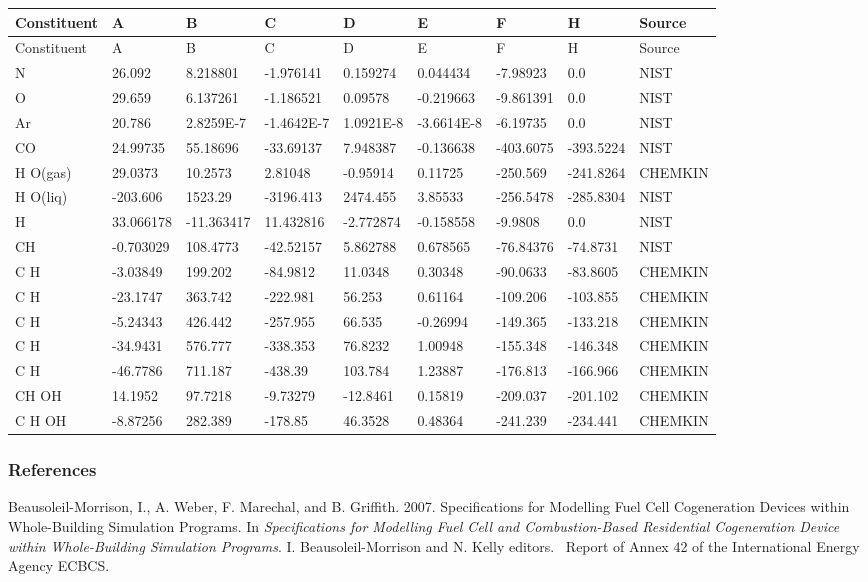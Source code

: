 \begin{longtable}[c]{p{0.66in}p{0.66in}p{0.66in}p{0.66in}p{0.66in}p{0.66in}p{0.66in}p{0.66in}p{0.66in}}
\toprule 
Constituent & A & B & C & D & E & F & H & Source \tabularnewline
\midrule
\endfirsthead

\toprule 
Constituent & A & B & C & D & E & F & H & Source \tabularnewline
\midrule
\endhead

N & 26.092 & 8.218801 & -1.976141 & 0.159274 & 0.044434 & -7.98923 & 0.0 & NIST \tabularnewline
O & 29.659 & 6.137261 & -1.186521 & 0.09578 & -0.219663 & -9.861391 & 0.0 & NIST \tabularnewline
Ar & 20.786 & 2.8259E-7 & -1.4642E-7 & 1.0921E-8 & -3.6614E-8 & -6.19735 & 0.0 & NIST \tabularnewline
CO & 24.99735 & 55.18696 & -33.69137 & 7.948387 & -0.136638 & -403.6075 & -393.5224 & NIST \tabularnewline
H  O(gas) & 29.0373 & 10.2573 & 2.81048 & -0.95914 & 0.11725 & -250.569 & -241.8264 & CHEMKIN \tabularnewline
H  O(liq) & -203.606 & 1523.29 & -3196.413 & 2474.455 & 3.85533 & -256.5478 & -285.8304 & NIST \tabularnewline
H & 33.066178 & -11.363417 & 11.432816 & -2.772874 & -0.158558 & -9.9808 & 0.0 & NIST \tabularnewline
CH & -0.703029 & 108.4773 & -42.52157 & 5.862788 & 0.678565 & -76.84376 & -74.8731 & NIST \tabularnewline
C  H & -3.03849 & 199.202 & -84.9812 & 11.0348 & 0.30348 & -90.0633 & -83.8605 & CHEMKIN \tabularnewline
C  H & -23.1747 & 363.742 & -222.981 & 56.253 & 0.61164 & -109.206 & -103.855 & CHEMKIN \tabularnewline
C  H & -5.24343 & 426.442 & -257.955 & 66.535 & -0.26994 & -149.365 & -133.218 & CHEMKIN \tabularnewline
C  H & -34.9431 & 576.777 & -338.353 & 76.8232 & 1.00948 & -155.348 & -146.348 & CHEMKIN \tabularnewline
C  H & -46.7786 & 711.187 & -438.39 & 103.784 & 1.23887 & -176.813 & -166.966 & CHEMKIN \tabularnewline
CH  OH & 14.1952 & 97.7218 & -9.73279 & -12.8461 & 0.15819 & -209.037 & -201.102 & CHEMKIN \tabularnewline
C  H  OH & -8.87256 & 282.389 & -178.85 & 46.3528 & 0.48364 & -241.239 & -234.441 & CHEMKIN \tabularnewline
\bottomrule
\end{longtable}

\subsubsection{References}\label{references-2-005}

Beausoleil-Morrison, I., A. Weber, F. Marechal, and B. Griffith. 2007. Specifications for Modelling Fuel Cell Cogeneration Devices within Whole-Building Simulation Programs. In \emph{Specifications for Modelling Fuel Cell and Combustion-Based Residential Cogeneration Device within Whole-Building Simulation Programs}. I. Beausoleil-Morrison and N. Kelly editors.~ Report of Annex 42 of the International Energy Agency ECBCS.

